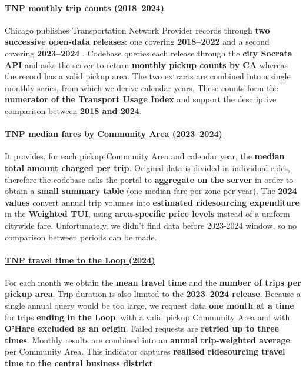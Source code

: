 \documentclass[10pt, a4paper]{article}
\newcommand{\datasettitle}[1]{\uline{#1}\penalty0\hspace{0pt}}
\begin{document}
\paragraph{\datasettitle{TNP monthly trip counts (2018--2024)}} Chicago publishes Transportation Network Provider records through \textbf{two successive open-data releases}: one covering \textbf{2018--2022} and a second covering \textbf{2023--2024} \cite{chicago_tnp,chicago_tnp_legacy}. Codebase queries each release through the \textbf{city Socrata API} and asks the server to return \textbf{monthly pickup counts by CA} whereas the record has a valid pickup area. The two extracts are combined into a single monthly series, from which we derive calendar years. These counts form the \textbf{numerator of the Transport Usage Index} and support the descriptive comparison between \textbf{2018 and 2024}.

\paragraph{\datasettitle{TNP median fares by Community Area (2023--2024)}} It provides, for each pickup Community Area and calendar year, the \textbf{median total amount charged per trip}. Original data is divided in individual rides, therefore the codebase asks the portal to \textbf{aggregate on the server} in order to obtain a \textbf{small summary table} (one median fare per zone per year). The \textbf{2024 values} convert annual trip volumes into \textbf{estimated ridesourcing expenditure} in the \textbf{Weighted TUI}, using \textbf{area-specific price levels} instead of a uniform citywide fare. Unfortunately, we didn't find data before 2023-2024 window, so no comparison between periods can be made.

\paragraph{\datasettitle{TNP travel time to the Loop (2024)}}  For each month we obtain the \textbf{mean travel time} and the \textbf{number of trips per pickup area}. Trip duration is also limited to the \textbf{2023--2024 release}. Because a single annual query would be too large, we request data \textbf{one month at a time} for trips \textbf{ending in the Loop}, with a valid pickup Community Area and with \textbf{O'Hare excluded as an origin}. Failed requests are \textbf{retried up to three times}. Monthly results are combined into an \textbf{annual trip-weighted average} per Community Area. This indicator captures \textbf{realised ridesourcing travel time to the central business district}.
\end{document}
